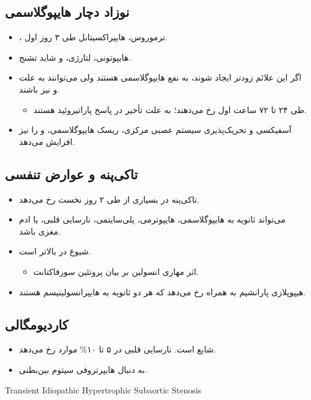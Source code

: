 \documentclass[12pt,a4paper]{article}
\begin{document}
\subsection*{نوزاد دچار هایپوگلاسمی}
\begin{itemize}
\item {}، ترموروس، هایپراکسیتابل طی ۳ روز اول.
\item هایپوتونی، لتارژی،  و شاید تشنج.
\item اگر این علائم زودتر ایجاد شوند، به نفع هایپوگلاسمی هستند ولی می‌توانند به علت  و  نیز باشند.
  \begin{itemize}
  \item طی ۲۴ تا ۷۲ ساعت اول رخ می‌دهند؛ به علت تأخیر در پاسخ پاراتیروئید هستند.
  \end{itemize}
\item آسفیکسی و تحریک‌پذیری سیستم عصبی مرکزی، ریسک هایپوگلاسمی،  و  را نیز افزایش می‌دهد.
\end{itemize}
\subsection*{تاکی‌پنه و عوارض تنفسی}
\begin{itemize}
\item تاکی‌پنه در بسیاری از  طی ۲ روز نخست رخ می‌دهد.
\item می‌تواند ثانویه به هایپوگلاسمی، هایپوترمی، پلی‌سایتمی، نارسایی قلبی،  یا ادم مغزی باشد.
\item شیوع  در  بالاتر است.
  \begin{itemize}
  \item اثر مهاری انسولین بر بیان پروتئین سورفاکتانت.
  \end{itemize}
\item هیپوپلازی پارانشیم به همراه  رخ می‌دهد که هر دو ثانویه به هایپرانسولینیسم هستند.
\end{itemize}
\subsection*{کاردیومگالی}
\begin{itemize}
\item شایع است. نارسایی قلبی در ۵ تا ۱۰\% موارد  رخ می‌دهد.
\item به دنبال هایپرتروفی سپتوم بین‌بطنی.
\end{itemize}
\begin{latin}
Transient Idiopathic Hypertrophic Subaortic Stenosis
\end{latin}
\end{document}
